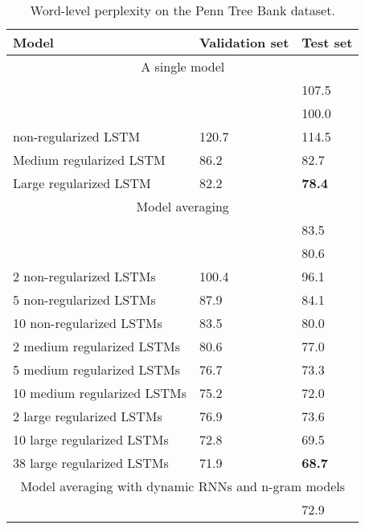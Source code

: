 \documentclass{article}
\begin{document}
\begin{table}[t]
  \small
  \centering
  \renewcommand{\arraystretch}{1.15}
  \begin{tabular}{lll}
    \hline
     Model & Validation set & Test set \\
    \hline
    \multicolumn{3}{c}{A single model} \\
    \hline
    \citet{pascanu2013construct} & & 107.5 \\
    \citet{chenglanguage} & & 100.0 \\
    non-regularized LSTM & 120.7 & 114.5 \\
    Medium regularized LSTM & 86.2 & 82.7 \\
    Large regularized LSTM & 82.2 & {\bf 78.4} \\
    \hline
    \multicolumn{3}{c}{Model averaging} \\
    \hline
    \citet{mikolov2012statistical} & & 83.5 \\
    \citet{chenglanguage} & & 80.6 \\
    2 non-regularized LSTMs & 100.4 & 96.1 \\
    5 non-regularized LSTMs & 87.9 & 84.1 \\
    10 non-regularized LSTMs & 83.5 & 80.0 \\
    2 medium regularized LSTMs & 80.6 & 77.0 \\
    5 medium regularized LSTMs & 76.7 & 73.3 \\
    10 medium regularized LSTMs & 75.2 & 72.0 \\
    2 large regularized LSTMs & 76.9 & 73.6 \\
    10 large regularized LSTMs & 72.8 & 69.5 \\
    38 large regularized LSTMs & 71.9 & {\bf 68.7} \\
    \hline
    \multicolumn{3}{c}{Model averaging with dynamic RNNs and n-gram models} \\
    \hline
    \citet{mikolov2012context} & & 72.9 \\
    \hline
  \end{tabular}
  \caption{Word-level perplexity on the Penn Tree Bank dataset.}
  \label{tab:ptb}
\end{table}
\end{document}
